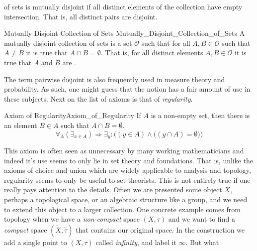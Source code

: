         of sets is mutually disjoint if all distinct elements of the collection
        have empty intersection. That is, all distinct pairs are disjoint.
        \begin{fdefinition}{Mutually Disjoint Collection of Sets}
                           {Mutually_Disjoint_Collection_of_Sets}
            A mutually disjoint collection of sets is a set $\mathcal{O}$ such
            that for all $A,B\in\mathcal{O}$ such that $A\ne{B}$ it is true that
            $A\cap{B}=\emptyset$. That is, for all distinct elements
            $A,B\in\mathcal{O}$ it is true that $A$ and $B$ are
            .
        \end{fdefinition}
        The term pairwise disjoint is also frequently
        used in measure theory and probability. As such, one might guess that
        the notion has a fair amount of use in these subjects. Next on the list
        of axioms is that of \textit{regularity}.
        \begin{faxiom}{Axiom of Regularity}{Axiom_of_Regularity}
            If $A$ is a non-empty set, then there is an element $B\in{A}$
            such that $A\cap{B}=\emptyset$.
            \begin{equation*}
                \forall_{A}(\exists_{x\in{A}})\Rightarrow
                \exists_{y}:\Big((y\in{A})\land
                \big((y\cap{A})=\emptyset\big)\Big)
            \end{equation*}
        \end{faxiom}
        This axiom is often seen as unnecessary by many working mathematicians
        and indeed it's use seems to only lie in set theory and foundations.
        That is, unlike the axioms of choice and union which are widely
        applicable to analysis and topology, regularity seems to only be useful
        to set theorists. This is not entirely true if one really pays attention
        to the details. Often we are presented some object $X$, perhaps a
        topological space, or an algebraic structure like a group, and we need
        to extend this object to a larger collection. One concrete example comes
        from topology when we have a \textit{non-compact} space $(X,\tau)$ and
        we want to find a \textit{compact} space $(\tilde{X},\tilde{\tau})$ that
        contains our original space. In the construction we add a single point
        to $(X,\tau)$ called \textit{infinity}, and label it $\infty$. But what
